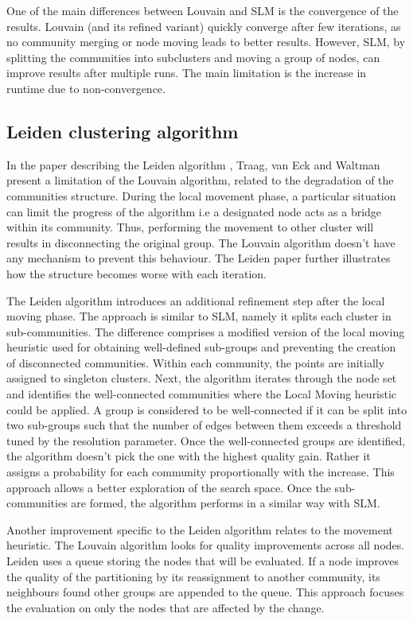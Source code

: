 One of the main differences between Louvain and SLM is the convergence of the results. Louvain (and its refined variant) quickly converge after few iterations, as no community merging or node moving leads to better results. However, SLM, by splitting the communities into subclusters and moving a group of nodes, can improve results after multiple runs. The main limitation is the increase in runtime due to non-convergence.

\subsection{Leiden clustering algorithm}
In the paper describing the Leiden algorithm \cite{Traag2019a}, Traag, van Eck and Waltman present a limitation of the Louvain algorithm, related to the degradation of the communities structure. During the local movement phase, a particular situation can limit the progress of the algorithm i.e a designated node acts as a bridge within its community. Thus, performing the movement to other cluster will results in disconnecting the original group. The Louvain algorithm doesn't have any mechanism to prevent this behaviour. The Leiden paper further illustrates how the structure becomes worse with each iteration.

The Leiden algorithm introduces an additional refinement step after the local moving phase. The approach is similar to SLM, namely it splits each cluster in sub-communities. The difference comprises a modified version of the local moving heuristic used for obtaining well-defined sub-groups and preventing the creation of disconnected communities. Within each community, the points are initially assigned to singleton clusters. Next, the algorithm iterates through the node set and identifies the well-connected communities where the Local Moving heuristic could be applied. A group is considered to be well-connected if it can be split into two sub-groups such that the number of edges between them exceeds a threshold tuned by the resolution parameter. Once the well-connected groups are identified, the algorithm doesn't pick the one with the highest quality gain. Rather it assigns a probability for each community proportionally with the increase. This approach allows a better exploration of the search space. Once the sub-communities are formed, the algorithm performs in a similar way with SLM.

Another improvement specific to the Leiden algorithm relates to the movement heuristic. The Louvain algorithm looks for quality improvements across all nodes. Leiden uses a queue storing the nodes that will be evaluated. If a node improves the quality of the partitioning by its reassignment to another community, its neighbours found other groups are appended to the queue. This approach focuses the evaluation on only the nodes that are affected by the change.

